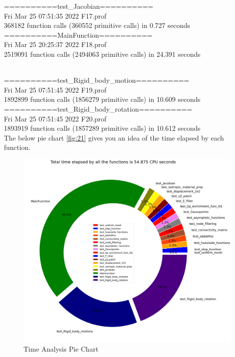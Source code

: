 \documentclass[fleqn, 12.5pt,a4paper]{report}
\newcommand\tab[1][1cm]{\hspace*{#1}}
\begin{document}
==========test{\_}Jacobian==========\\
Fri Mar 25 07:51:35 2022 \tab[1cm]   F17.prof\\
368182 function calls (360552 primitive calls) in 0.727 seconds\\

==========MainFunction==========\\
Fri Mar 25 20:25:37 2022 \tab[1cm]   F18.prof\\
2519091 function calls (2494063 primitive calls) in 24.391 seconds

\\
==========test{\_}Rigid{\_}body{\_}motion==========\\
Fri Mar 25 07:51:45 2022 \tab[1cm]   F19.prof\\
1892899 function calls (1856279 primitive calls) in 10.609 seconds\\

==========test{\_}Rigid{\_}body{\_}rotation==========\\
Fri Mar 25 07:51:45 2022 \tab[1cm]  F20.prof\\
1893919 function calls (1857289 primitive calls) in 10.612 seconds\\

\newpage
The below pie chart \autoref{fig:21} gives you an idea of the time elapsed by 
each function.
\\

\begin{figure}[h]
    \centering
    \includegraphics[scale = 0.35]{PIE.png}
    \caption{Time Analysis Pie Chart}
    \label{fig:21}
\end{figure}

\newpage


\end{document}

